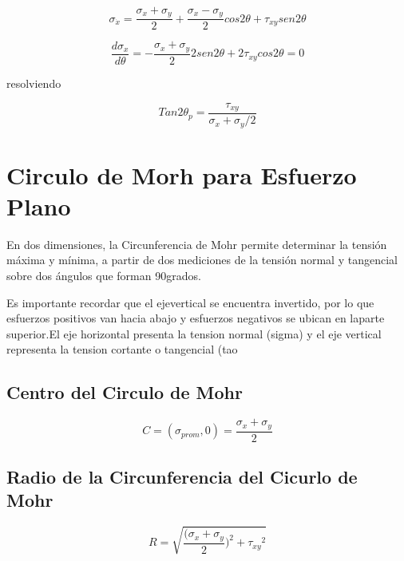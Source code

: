 \documentclass{article}
\begin{document}
\begin{equation}
   \sigma_{\dot{x}}=\frac{\sigma_{x}+ \sigma_{y}}{2} + \frac{\sigma_{x} -\sigma_{y}}{2}  cos2\theta + \tau_{xy}sen2\theta
\end{equation}



\begin{equation}
 \frac{d\sigma_{x}}{d\theta} = - \frac{\sigma_{x}+ \sigma_{y}}{2} 2sen2\theta + 2\tau_{xy}cos2\theta  = 0
\end{equation}

 resolviendo


\begin{equation}
Tan2\theta_{p}=\frac{\tau_{xy}}{\sigma_{x}+\sigma_{y}/2}
\end{equation}



\section{Circulo de Morh para Esfuerzo Plano}


En dos dimensiones, la Circunferencia de Mohr permite determinar la tensi\'on m\'axima  y m\'inima, a partir de dos mediciones de la tensi\'on normal
 y tangencial sobre  dos \'angulos que forman 90grados. 


Es importante recordar que el ejevertical se encuentra invertido, por lo que esfuerzos positivos van hacia abajo y esfuerzos 
negativos se ubican en laparte superior.El eje horizontal presenta la tension normal (sigma) y el eje vertical representa la tension cortante o tangencial (tao


\subsection{Centro del Circulo de Mohr}

\begin{equation}
C= ( \sigma_{prom} , 0) = \frac{\sigma_{x}+ \sigma_{y}}{2}
\end{equation}

\subsection{Radio de la Circunferencia del Cicurlo de Mohr}

\begin{equation}
 R=\sqrt{\frac{(\sigma_{x}+\sigma_{y}}{2})^2 +{\tau_{xy}}^2}
\end{equation}
\end{document}
